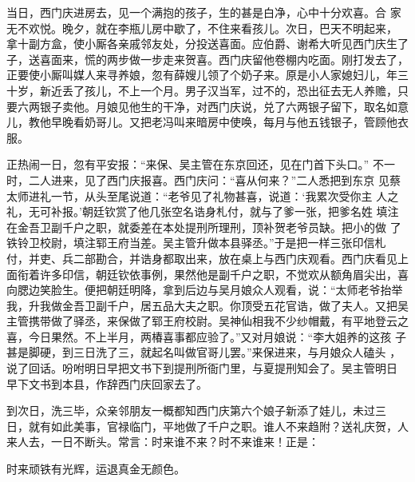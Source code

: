当日，西门庆进房去，见一个满抱的孩子，生的甚是白净，心中十分欢喜。合
家无不欢悦。晚夕，就在李瓶儿房中歇了，不住来看孩儿。次日，巴天不明起来，
拿十副方盒，使小厮各亲戚邻友处，分投送喜面。应伯爵、谢希大听见西门庆生了
子，送喜面来，慌的两步做一步走来贺喜。西门庆留他卷棚内吃面。刚打发去了，
正要使小厮叫媒人来寻养娘，忽有薛嫂儿领了个奶子来。原是小人家媳妇儿，年三
十岁，新近丢了孩儿，不上一个月。男子汉当军，过不的，恐出征去无人养赡，只
要六两银子卖他。月娘见他生的干净，对西门庆说，兑了六两银子留下，取名如意
儿，教他早晚看奶哥儿。又把老冯叫来暗房中使唤，每月与他五钱银子，管顾他衣
服。

正热闹一日，忽有平安报：“来保、吴主管在东京回还，见在门首下头口。”
不一时，二人进来，见了西门庆报喜。西门庆问：“喜从何来？”二人悉把到东京
见蔡太师进礼一节，从头至尾说道：“老爷见了礼物甚喜，说道：‘我累次受你主
人之礼，无可补报。’朝廷钦赏了他几张空名诰身札付，就与了爹一张，把爹名姓
填注在金吾卫副千户之职，就委差在本处提刑所理刑，顶补贺老爷员缺。把小的做
了铁铃卫校尉，填注郓王府当差。吴主管升做本县驿丞。”于是把一样三张印信札
付，并吏、兵二部勘合，并诰身都取出来，放在桌上与西门庆观看。西门庆看见上
面衔着许多印信，朝廷钦依事例，果然他是副千户之职，不觉欢从额角眉尖出，喜
向腮边笑脸生。便把朝廷明降，拿到后边与吴月娘众人观看，说：“太师老爷抬举
我，升我做金吾卫副千户，居五品大夫之职。你顶受五花官诰，做了夫人。又把吴
主管携带做了驿丞，来保做了郓王府校尉。吴神仙相我不少纱帽戴，有平地登云之
喜，今日果然。不上半月，两椿喜事都应验了。”又对月娘说：“李大姐养的这孩
子甚是脚硬，到三日洗了三，就起名叫做官哥儿罢。”来保进来，与月娘众人磕头
，说了回话。吩咐明日早把文书下到提刑所衙门里，与夏提刑知会了。吴主管明日
早下文书到本县，作辞西门庆回家去了。

到次日，洗三毕，众亲邻朋友一概都知西门庆第六个娘子新添了娃儿，未过三
日，就有如此美事，官禄临门，平地做了千户之职。谁人不来趋附？送礼庆贺，人
来人去，一日不断头。常言：时来谁不来？时不来谁来！正是：

时来顽铁有光辉，运退真金无颜色。